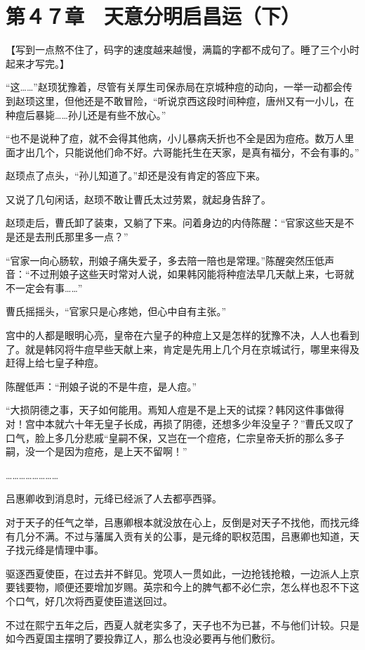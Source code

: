 \section{第４７章　天意分明启昌运（下）}

【写到一点熬不住了，码字的速度越来越慢，满篇的字都不成句了。睡了三个小时起来才写完。】

“这……”赵顼犹豫着，尽管有关厚生司保赤局在京城种痘的动向，一举一动都会传到赵顼这里，但他还是不敢冒险，“听说京西这段时间种痘，唐州又有一小儿，在种痘后暴毙……孙儿还是有些不放心。”

“也不是说种了痘，就不会得其他病，小儿暴病夭折也不全是因为痘疮。数万人里面才出几个，只能说他们命不好。六哥能托生在天家，是真有福分，不会有事的。”

赵顼点了点头，“孙儿知道了。”却还是没有肯定的答应下来。

又说了几句闲话，赵顼不敢让曹氏太过劳累，就起身告辞了。

赵顼走后，曹氏卸了装束，又躺了下来。问着身边的内侍陈醒：“官家这些天是不是还是去刑氏那里多一点？”

“官家一向心肠软，刑娘子痛失爱子，多去陪一陪也是常理。”陈醒突然压低声音：“不过刑娘子这些天时常对人说，如果韩冈能将种痘法早几天献上来，七哥就不一定会有事……”

曹氏摇摇头，“官家只是心疼她，但心中自有主张。”

宫中的人都是眼明心亮，皇帝在六皇子的种痘上又是怎样的犹豫不决，人人也看到了。就是韩冈将牛痘早些天献上来，肯定是先用上几个月在京城试行，哪里来得及赶得上给七皇子种痘。

陈醒低声：“刑娘子说的不是牛痘，是人痘。”

“大损阴德之事，天子如何能用。焉知人痘是不是上天的试探？韩冈这件事做得对！宫中本就六十年无皇子长成，再损了阴德，还想多少年没皇子？”曹氏又叹了口气，脸上多几分悲戚“皇嗣不保，又岂在一个痘疮，仁宗皇帝夭折的那么多子嗣，没一个是因为痘疮，是上天不留啊！”

……………………

吕惠卿收到消息时，元绛已经派了人去都亭西驿。

对于天子的任气之举，吕惠卿根本就没放在心上，反倒是对天子不找他，而找元绛有几分不满。不过与藩属入贡有关的公事，是元绛的职权范围，吕惠卿也知道，天子找元绛是情理中事。

驱逐西夏使臣，在过去并不鲜见。党项人一贯如此，一边抢钱抢粮，一边派人上京要钱要物，顺便还要增加岁赐。英宗和今上的脾气都不必仁宗，怎么样也忍不下这个口气，好几次将西夏使臣遣送回过。

不过在熙宁五年之后，西夏人就老实多了，天子也不为已甚，不与他们计较。只是如今西夏国主摆明了要投靠辽人，那么也没必要再与他们敷衍。

